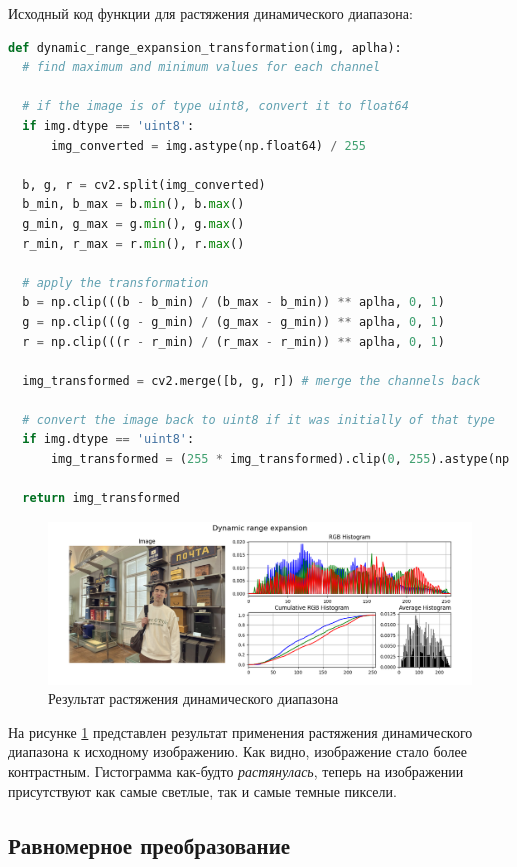 Исходный код функции для растяжения динамического диапазона:

\begin{lstlisting}[language=Python]
def dynamic_range_expansion_transformation(img, aplha):
  # find maximum and minimum values for each channel

  # if the image is of type uint8, convert it to float64
  if img.dtype == 'uint8':
      img_converted = img.astype(np.float64) / 255

  b, g, r = cv2.split(img_converted)
  b_min, b_max = b.min(), b.max()
  g_min, g_max = g.min(), g.max()
  r_min, r_max = r.min(), r.max()

  # apply the transformation
  b = np.clip(((b - b_min) / (b_max - b_min)) ** aplha, 0, 1)
  g = np.clip(((g - g_min) / (g_max - g_min)) ** aplha, 0, 1)
  r = np.clip(((r - r_min) / (r_max - r_min)) ** aplha, 0, 1)

  img_transformed = cv2.merge([b, g, r]) # merge the channels back

  # convert the image back to uint8 if it was initially of that type
  if img.dtype == 'uint8':
      img_transformed = (255 * img_transformed).clip(0, 255).astype(np.uint8)

  return img_transformed
\end{lstlisting}

\begin{figure}[H]
    \centering
    \includegraphics[width=\textwidth]{../results/Dynamic range expansion.png}
    \caption{Результат растяжения динамического диапазона}
    \label{fig:dynamic}
\end{figure}

На рисунке \ref{fig:dynamic} представлен результат применения растяжения динамического диапазона к исходному изображению. Как видно, изображение стало более контрастным. 
Гистограмма как-будто \textit{растянулась}, теперь на изображении присутствуют как самые светлые, так и самые темные пиксели. 

\subsection{Равномерное преобразование}

